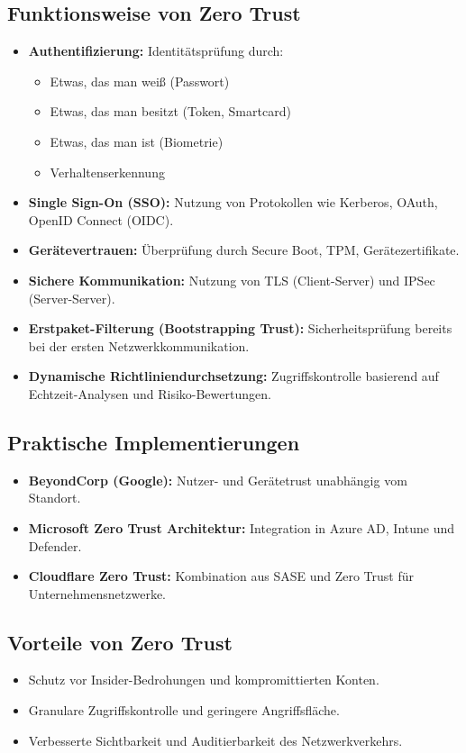 \subsection{Funktionsweise von Zero Trust}
\begin{itemize}
    \item \textbf{Authentifizierung:} Identitätsprüfung durch:
    \begin{itemize}
        \item Etwas, das man weiß (Passwort)
        \item Etwas, das man besitzt (Token, Smartcard)
        \item Etwas, das man ist (Biometrie)
        \item Verhaltenserkennung
    \end{itemize}
    \item \textbf{Single Sign-On (SSO):} Nutzung von Protokollen wie Kerberos, OAuth, OpenID Connect (OIDC).
    \item \textbf{Gerätevertrauen:} Überprüfung durch Secure Boot, TPM, Gerätezertifikate.
    \item \textbf{Sichere Kommunikation:} Nutzung von TLS (Client-Server) und IPSec (Server-Server).
    \item \textbf{Erstpaket-Filterung (Bootstrapping Trust):} Sicherheitsprüfung bereits bei der ersten Netzwerkkommunikation.
    \item \textbf{Dynamische Richtliniendurchsetzung:} Zugriffskontrolle basierend auf Echtzeit-Analysen und Risiko-Bewertungen.
\end{itemize}

\subsection{Praktische Implementierungen}
\begin{itemize}
    \item \textbf{BeyondCorp (Google):} Nutzer- und Gerätetrust unabhängig vom Standort.
    \item \textbf{Microsoft Zero Trust Architektur:} Integration in Azure AD, Intune und Defender.
    \item \textbf{Cloudflare Zero Trust:} Kombination aus SASE und Zero Trust für Unternehmensnetzwerke.
\end{itemize}

\subsection{Vorteile von Zero Trust}
\begin{itemize}
    \item Schutz vor Insider-Bedrohungen und kompromittierten Konten.
    \item Granulare Zugriffskontrolle und geringere Angriffsfläche.
    \item Verbesserte Sichtbarkeit und Auditierbarkeit des Netzwerkverkehrs.
\end{itemize}

